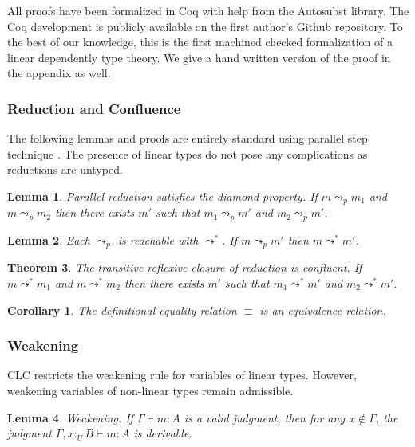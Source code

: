 \documentclass[sigplan,screen]{acmart}
\newtheorem{theorem}{Theorem}[section]
\newtheorem{corollary}{Corollary}[theorem]
\newtheorem{lemma}[theorem]{Lemma}
\theoremstyle{definition}
\newcommand{\utype}{:_{\scriptscriptstyle U}}
\newcommand{\step}{\leadsto}
\newcommand{\pstep}{\leadsto}
\begin{document}
  All proofs have been formalized in Coq with help from the Autosubst \cite{autosubst} library. The Coq development is publicly available on the first author's Github repository. To the best of our knowledge, this is the first machined checked formalization of a linear dependently type theory. We give a hand written version of the proof in the appendix as well.

  \subsubsection{Reduction and Confluence}

  The following lemmas and proofs are entirely standard using parallel step technique \cite{takahashi}. The presence of linear types do not pose any complications as reductions are untyped.

  \begin{lemma} 
    Parallel reduction satisfies the diamond property. If $m \pstep_p m_1$ and $m \pstep_p m_2$ then there exists $m'$ such that $m_1 \pstep_p m'$ and $m_2 \pstep_p m'$.
  \end{lemma}

  \begin{lemma} 
    Each $\pstep_p$ is reachable with $\step^*$. If $m \pstep_p m'$ then $m \step^* m'$.
  \end{lemma}

  \begin{theorem} 
    The transitive reflexive closure of reduction is confluent. If $m \step^* m_1$ and $m \step^* m_2$ then there exists $m'$ such that $m_1 \pstep^* m'$ and $m_2 \pstep^* m'$.
  \end{theorem}

  \begin{corollary}
    The definitional equality relation $\equiv$ is an equivalence relation.
  \end{corollary}

  \subsubsection{Weakening} \label{weakening}
  CLC restricts the weakening rule for variables of linear types. However, weakening variables of non-linear types remain admissible.

  \begin{lemma} 
    Weakening. If $\Gamma \vdash m : A$ is a valid judgment, then for any $x \notin \Gamma$, the judgment $\Gamma, x \utype B \vdash m : A$ is derivable.
  \end{lemma}
\end{document}
